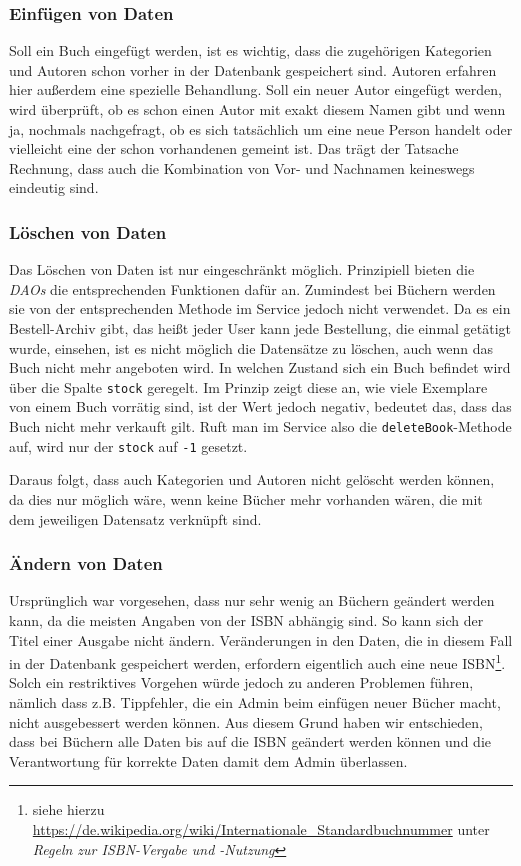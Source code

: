 		\subsubsection{Einfügen von Daten}\label{umsetzung:DB:Einfuegen}
		Soll ein Buch eingefügt werden, ist es wichtig, dass die zugehörigen Kategorien und Autoren schon vorher in der Datenbank gespeichert sind. Autoren erfahren hier außerdem eine spezielle Behandlung. Soll ein neuer Autor eingefügt werden, wird überprüft, ob es schon einen Autor mit exakt diesem Namen gibt und wenn ja, nochmals nachgefragt, ob es sich tatsächlich um eine neue Person handelt oder vielleicht eine der schon vorhandenen gemeint ist. Das trägt der Tatsache Rechnung, dass auch die Kombination von Vor- und Nachnamen keineswegs eindeutig sind. 
		
		\subsubsection{Löschen von Daten}\label{umsetzung:DB:Loeschen}
		Das Löschen von Daten ist nur eingeschränkt möglich. Prinzipiell bieten die \textit{DAOs} die entsprechenden Funktionen dafür an. Zumindest bei Büchern werden sie von der entsprechenden Methode im Service jedoch nicht verwendet. Da es ein Bestell-Archiv gibt, das heißt jeder User kann jede Bestellung, die einmal getätigt wurde, einsehen, ist es nicht möglich die Datensätze zu löschen, auch wenn das Buch nicht mehr angeboten wird. In welchen Zustand sich ein Buch befindet wird über die Spalte \texttt{stock} geregelt. Im Prinzip zeigt diese an, wie viele Exemplare von einem Buch vorrätig sind, ist der Wert jedoch negativ, bedeutet das, dass das Buch nicht mehr verkauft gilt. Ruft man im Service also die \texttt{deleteBook}-Methode auf, wird nur der \texttt{stock} auf \texttt{-1} gesetzt.
		
		Daraus folgt, dass auch Kategorien und Autoren nicht gelöscht werden können, da dies nur möglich wäre, wenn keine Bücher mehr vorhanden wären, die mit dem jeweiligen Datensatz verknüpft sind.
		
		\subsubsection{Ändern von Daten}\label{umsetzung:DB:Aendern}
		Ursprünglich war vorgesehen, dass nur sehr wenig an Büchern geändert werden kann, da die meisten Angaben von der ISBN abhängig sind. So kann sich der Titel einer Ausgabe nicht ändern. Veränderungen in den Daten, die in diesem Fall in der Datenbank gespeichert werden, erfordern eigentlich auch eine neue ISBN\footnote{siehe hierzu \url{https://de.wikipedia.org/wiki/Internationale_Standardbuchnummer} unter \textit{Regeln zur ISBN-Vergabe und -Nutzung}}. Solch ein restriktives Vorgehen würde jedoch zu anderen Problemen führen, nämlich dass z.B. Tippfehler, die ein Admin beim einfügen neuer Bücher macht, nicht ausgebessert werden können. Aus diesem Grund haben wir entschieden, dass bei Büchern alle Daten bis auf die ISBN geändert werden können und die Verantwortung für korrekte Daten damit dem Admin überlassen.
	
